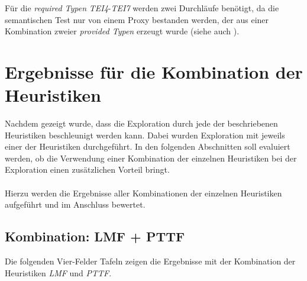 \begin{multicols}{2}
\columnbreak
{}
\end{multicols}
\begin{multicols}{2}
\columnbreak
{}
\end{multicols}
\begin{multicols}{2}
\columnbreak
{}
\end{multicols}
\noindent
Für die \emph{required Typen} \emph{TEI4}-\emph{TEI7} werden zwei Durchläufe benötigt, da die semantischen Test nur von einem Proxy bestanden werden, der aus einer Kombination zweier \emph{provided Typen} erzeugt wurde (siehe auch ).





\section{Ergebnisse für die Kombination der Heuristiken}
Nachdem gezeigt wurde, dass die Exploration durch jede der beschriebenen Heuristiken beschleunigt werden kann. Dabei wurden Exploration mit jeweils einer der Heuristiken durchgeführt. In den folgenden Abschnitten soll evaluiert werden, ob die Verwendung einer Kombination der einzelnen Heuristiken bei der Exploration einen zusätzlichen Vorteil bringt.
\\\\
Hierzu werden die Ergebnisse aller Kombinationen der einzelnen Heuristiken aufgeführt und im Anschluss bewertet.
\subsection{Kombination: LMF + PTTF}\label{sec_evalLMFPTTF}
Die folgenden Vier-Felder Tafeln zeigen die Ergebnisse mit der Kombination der Heuristiken \emph{LMF} und \emph{PTTF}.
\begin{multicols}{3}
\columnbreak
{}\columnbreak
{}
\end{multicols}

